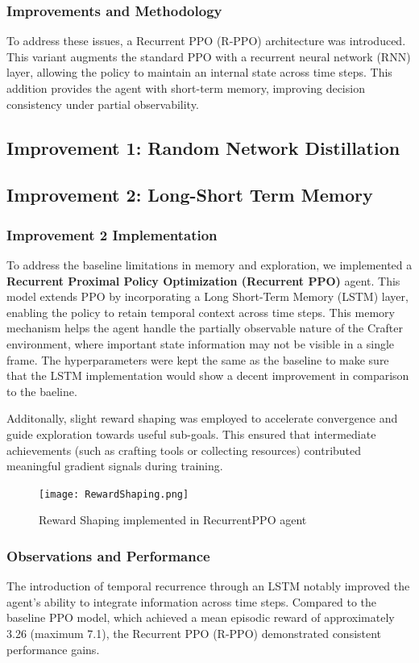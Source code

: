\documentclass[twocolumn]{article}
\begin{document}
\subsubsection*{Improvements and Methodology}
To address these issues, a Recurrent PPO (R-PPO) architecture was introduced. This variant augments the standard PPO with a recurrent neural network (RNN) layer, allowing the policy to maintain an internal state across time steps. This addition provides the agent with short-term memory, improving decision consistency under partial observability.

\subsection*{Improvement 1: Random Network Distillation}
\subsection*{Improvement 2: Long-Short Term Memory}

\subsubsection*{Improvement 2 Implementation}
To address the baseline limitations in memory and exploration, we implemented a \textbf{Recurrent Proximal Policy Optimization (Recurrent PPO)} agent. This model extends PPO by incorporating a Long Short-Term Memory (LSTM) layer, enabling the policy to retain temporal context across time steps. This memory mechanism helps the agent handle the partially observable nature of the Crafter environment, where important state information may not be visible in a single frame.
The hyperparameters were kept the same as the baseline to make sure that the LSTM implementation would show a decent improvement in comparison to the baeline.

Additonally, slight reward shaping was employed to accelerate convergence and guide exploration towards useful sub-goals. This ensured that intermediate achievements (such as crafting tools or collecting resources) contributed meaningful gradient signals during training.
\begin{figure}[H]
    \centering
    \texttt{[image: RewardShaping.png]}
    \caption{Reward Shaping implemented in RecurrentPPO agent}
\end{figure}

\subsubsection*{Observations and Performance}
The introduction of temporal recurrence through an LSTM notably improved the agent's ability to integrate information across time steps. Compared to the baseline PPO model, which achieved a mean episodic reward of approximately 3.26 (maximum 7.1), the Recurrent PPO (R-PPO) demonstrated consistent performance gains.
\end{document}
